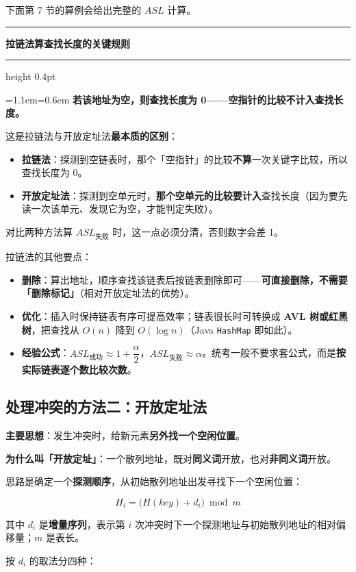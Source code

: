 \documentclass[11pt,openany,UTF8]{ctexbook}
\newcommand{\callouthead}[2]{%
  \par\addvspace{7pt}\noindent
  {\color{#1}\rule[-0.15em]{3pt}{1.05em}}\hspace{0.5em}%
  {\bfseries\color{#1}#2}\par\nobreak\vspace{-0.35em}%
  {\color{rulesep}\hrule height 0.4pt}\nobreak\vspace{0.45em}%
  \begingroup\small\setlength{\parindent}{0pt}%
  \leftskip=1.1em\rightskip=0.6em\noindent\ignorespaces}
\newcommand{\calloutend}{\par\endgroup\addvspace{7pt}}
\newenvironment{callkey}[1]{\callouthead{keybar}{#1}}{\calloutend}
\begin{document}
下面第 7 节的算例会给出完整的 $ASL$ 计算。

\begin{callkey}{拉链法算查找长度的关键规则}
\textbf{若该地址为空，则查找长度为 0——空指针的比较不计入查找长度。}

这是拉链法与开放定址法\textbf{最本质的区别}：

\begin{itemize}
\item \textbf{拉链法}：探测到空链表时，那个「空指针」的比较\textbf{不算}一次关键字比较，所以查找长度为 0。
\item \textbf{开放定址法}：探测到空单元时，\textbf{那个空单元的比较要计入}查找长度（因为要先读一次该单元、发现它为空，才能判定失败）。
\end{itemize}
对比两种方法算 $ASL_{失败}$ 时，这一点必须分清，否则数字会差 1。

\end{callkey}

拉链法的其他要点：

\begin{itemize}
\item \textbf{删除}：算出地址，顺序查找该链表后按链表删除即可——\textbf{可直接删除，不需要「删除标记」}（相对开放定址法的优势）。
\item \textbf{优化}：插入时保持链表有序可提高效率；链表很长时可转换成 \textbf{AVL 树或红黑树}，把查找从 $O(n)$ 降到 $O(\log n)$（Java \texttt{HashMap} 即如此）。
\item \textbf{经验公式}：$ASL_{成功}\approx 1+\dfrac{\alpha}{2}$，$ASL_{失败}\approx \alpha$。统考一般不要求套公式，而是\textbf{按实际链表逐个数比较次数}。
\end{itemize}
\subsection{处理冲突的方法二：开放定址法}

\textbf{主要思想}：发生冲突时，给新元素\textbf{另外找一个空闲位置}。

\textbf{为什么叫「开放定址」}：一个散列地址，既对\textbf{同义词}开放，也对\textbf{非同义词}开放。

思路是确定一个\textbf{探测顺序}，从初始散列地址出发寻找下一个空闲位置：

\[H_i=\big(H(key)+d_i\big)\bmod m\]

其中 $d_i$ 是\textbf{增量序列}，表示第 $i$ 次冲突时下一个探测地址与初始散列地址的相对偏移量；$m$ 是表长。

按 $d_i$ 的取法分四种：
\end{document}
